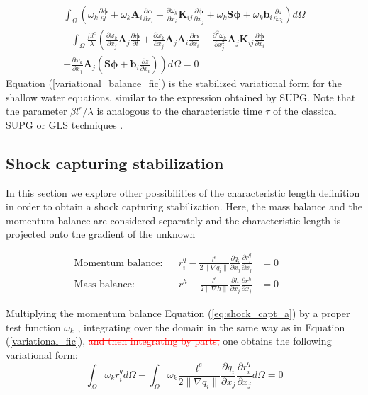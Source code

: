 \documentclass[a4paper,12pt]{elsarticle}
\newcommand{\Miguel}[1]{\textcolor{red}{#1}}
\newcommand{\pder}[2]{\frac{\partial#1}{\partial#2}}
\newcommand{\ppder}[2]{\frac{\partial^2#1}{\partial#2^2}}
\newcommand{\norm}[1]{\lVert#1\rVert}
\begin{document}
\begin{multline} \label{variational_balance_fic}
\int_\Omega \left(
    \omega_k \pder{\bm{\phi}}{t} + \omega_k \mathbf{A}_i\pder{\bm{\phi}}{x_i}
    + \pder{\omega_k}{x_i} \mathbf{K}_{ij} \pder{\bm{\phi}}{x_j} + \omega_k \mathbf{S}\bm{\phi} + \omega_k \mathbf{b}_i\pder{z}{x_i}
\right) d\Omega\\ +
\int_\Omega \frac{\beta l^e}{\lambda} \left(
    \pder{\omega_k}{x_j} \mathbf{A}_j \pder{\bm{\phi}}{t}
    + \pder{\omega_k}{x_j} \mathbf{A}_j\mathbf{A}_i\pder{\bm{\phi}}{x_i}
    + \ppder{\omega_k}{x_j} \mathbf{A}_j\mathbf{K}_{ij} \pder{\bm{\phi}}{x_i} \right. \\
    \left.
    + \pder{\omega_k}{x_j} \mathbf{A}_j \left( \mathbf{S}\bm{\phi} + \mathbf{b}_i\pder{z}{x_i} \right)
\right) d\Omega
=0
\end{multline}
Equation (\ref{variational_balance_fic}) is the stabilized variational form for the shallow water equations, similar to the expression obtained by SUPG. Note that the parameter $\beta l^e/\lambda$ is analogous to the characteristic time $\tau$ of the classical SUPG or GLS techniques \cite{cotela2016}.

\subsection{Shock capturing stabilization}

In this section we explore other possibilities of the characteristic length definition in order to obtain a shock capturing stabilization. Here, the mass balance and the momentum balance are considered separately and the characteristic length is projected onto the gradient of the unknown

\begin{subequations} \label{eq:shock_capt}
\begin{align}
\text{Momentum balance:} &&
    r_i^q - \frac{l^e}{2\norm{\nabla q_i}}\pder{q_i}{x_j}\pder{r_i^q}{x_j} &= 0 \label{eq:shock_capt_a} && \\ 
\text{Mass balance:} &&
    r^h - \frac{l^e}{2\norm{\nabla h}} \pder{h}{x_j} \pder{r^h}{x_j} &=0 \label{eq:shock_capt_b}
\end{align}
\end{subequations}

Multiplying the momentum balance Equation (\ref{eq:shock_capt_a}) by a proper test function $\omega_k$ , integrating over the domain in the same way as in Equation (\ref{variational_fic}), \Miguel{\sout{and then integrating by parts,}} one obtains the following variational form:
\begin{equation}
    \int_\Omega \omega_k r_i^q d\Omega
     - \int_\Omega \omega_k \frac{l^e}{2\norm{\nabla q_i}}\pder{q_i}{x_j}\pder{r_i^q}{x_j}
     d\Omega = 0
    \label{partial_variational_shock_capt}
\end{equation}
\end{document}
